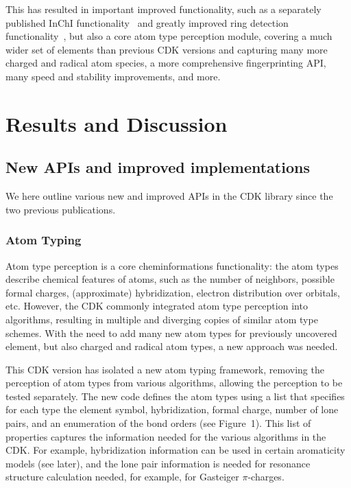 \documentclass[10pt]{bmcart}
\begin{document}
This has resulted in important improved functionality, such as a separately published
InChI functionality~\cite{Spjuth2013} and greatly improved ring detection functionality~\cite{May2014},
but also a core atom type perception module, covering a much wider set of elements than
previous CDK versions and capturing many more charged and radical atom species,
a more comprehensive fingerprinting API, many speed and stability improvements, and more.

\section*{Results and Discussion}

\subsection*{New APIs and improved implementations}

We here outline various new and improved APIs in the CDK library since the two previous
publications.

  \subsubsection*{Atom Typing}

  Atom type perception is a core cheminformations functionality: the atom types describe
  chemical features of atoms, such as the number of neighbors, possible formal charges,
  (approximate) hybridization, electron distribution over orbitals, etc. However, the
  CDK commonly integrated atom type perception into algorithms, resulting in multiple
  and diverging copies of similar atom type schemes. With the need to add many
  new atom types for previously uncovered element, but also charged and radical atom
  types, a new approach was needed.
  
  This CDK version has isolated a new atom typing framework, removing the perception of
  atom types from various algorithms, allowing the perception to be tested separately.
  The new code defines the atom types using a list that specifies for each type
  the element symbol, hybridization, formal charge, number of lone pairs, and
  an enumeration of the bond orders (see Figure~1). This list of properties captures the
  information needed for the various algorithms in the CDK. For example,
  hybridization information can be used in certain aromaticity models (see later),
  and the lone pair information is needed for resonance structure calculation
  needed, for example, for Gasteiger $\pi$-charges.
\end{document}

